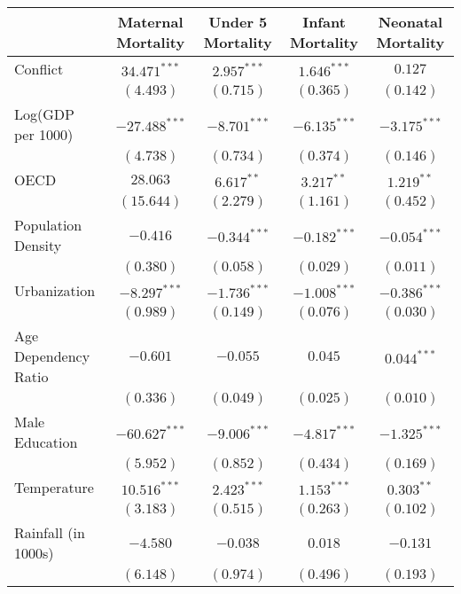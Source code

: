 
\begin{table}
\begin{center}
\begin{tabular}{l c c c c}
\hline
 & Maternal Mortality & Under 5 Mortality & Infant Mortality & Neonatal Mortality \\
\hline
Conflict             & $34.471^{***}$  & $2.957^{***}$  & $1.646^{***}$  & $0.127$        \\
                     & $(4.493)$       & $(0.715)$      & $(0.365)$      & $(0.142)$      \\
Log(GDP per 1000)    & $-27.488^{***}$ & $-8.701^{***}$ & $-6.135^{***}$ & $-3.175^{***}$ \\
                     & $(4.738)$       & $(0.734)$      & $(0.374)$      & $(0.146)$      \\
OECD                 & $28.063$        & $6.617^{**}$   & $3.217^{**}$   & $1.219^{**}$   \\
                     & $(15.644)$      & $(2.279)$      & $(1.161)$      & $(0.452)$      \\
Population Density   & $-0.416$        & $-0.344^{***}$ & $-0.182^{***}$ & $-0.054^{***}$ \\
                     & $(0.380)$       & $(0.058)$      & $(0.029)$      & $(0.011)$      \\
Urbanization         & $-8.297^{***}$  & $-1.736^{***}$ & $-1.008^{***}$ & $-0.386^{***}$ \\
                     & $(0.989)$       & $(0.149)$      & $(0.076)$      & $(0.030)$      \\
Age Dependency Ratio & $-0.601$        & $-0.055$       & $0.045$        & $0.044^{***}$  \\
                     & $(0.336)$       & $(0.049)$      & $(0.025)$      & $(0.010)$      \\
Male Education       & $-60.627^{***}$ & $-9.006^{***}$ & $-4.817^{***}$ & $-1.325^{***}$ \\
                     & $(5.952)$       & $(0.852)$      & $(0.434)$      & $(0.169)$      \\
Temperature          & $10.516^{***}$  & $2.423^{***}$  & $1.153^{***}$  & $0.303^{**}$   \\
                     & $(3.183)$       & $(0.515)$      & $(0.263)$      & $(0.102)$      \\
Rainfall (in 1000s)  & $-4.580$        & $-0.038$       & $0.018$        & $-0.131$       \\
                     & $(6.148)$       & $(0.974)$      & $(0.496)$      & $(0.193)$      \\

\end{tabular}
\end{center}
\end{table}
